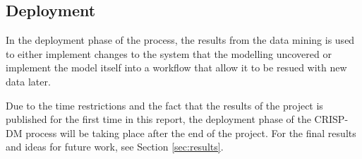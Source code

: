 \subsection{Deployment}

In the deployment phase of the process, the results from the data mining is used
to either implement changes to the system that the modelling uncovered or
implement the model itself into a workflow that allow it to be resued with new
data later.

Due to the time restrictions and the fact that the results of the project is
published for the first time in this report, the deployment phase of the CRISP-
DM process will be taking place after the end of the project. For the final
results and ideas for future work, see Section \ref{sec:results}.
